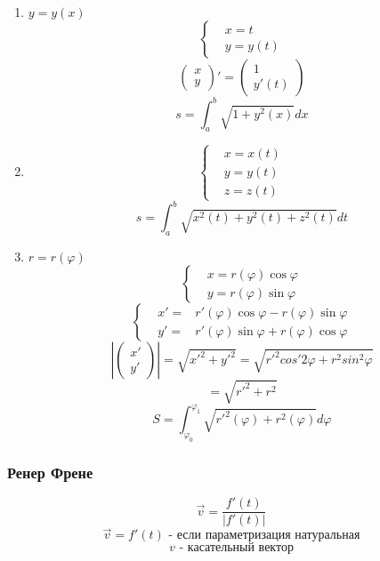 \documentclass[12pt, fleqn]{article}
\begin{document}
\begin{examples}
		\begin{enumerate}
			\item $y = y(x)$
				\[\left\{\begin{align}
						&x = t\\
						&y = y(t)
				\end{align}\]
				\[\begin{pmatrix}
					x\\
					y
				\end{pmatrix}' = \begin{pmatrix}
					1\\
					y'(t)
				\end{pmatrix}\]
				\[s = \int_a^b \sqrt{1 + y^2(x)} dx\]
			\item \[\displaystyle \left \{ \begin{align}
					& x = x(t)\\
					& y = y(t)\\
					& z = z(t)
					\end{align}\]
					\[s = \int_a^b \sqrt{x^2(t) + y^2(t) + z^2(t)}dt\]
			\item $r = r(\varphi)$
				\[\left\{ \begin{align}
						&x = r(\varphi) \cos \varphi\\
						&y = r(\varphi) \sin \varphi
				\end{align}\]
				\[\left\{ \begin{align}
						&x' = &r'(\varphi) \cos \varphi - r(\varphi)\sin \varphi\\
						&y' = &r'(\varphi) \sin \varphi + r(\varphi)\cos \varphi
				\end{align}\]
				\[|\begin{pmatrix}
					x'\\
					y'
				\end{pmatrix}| = 
				\sqrt{x'^2 + y'^2} = \sqrt{r'^2 cos'2 \varphi + r^2 sin^2 \varphi }\]
				\[= \sqrt{r'^2 + r^2}\]
				\[S = \int_{\varphi_0}^{\varphi_1} \sqrt{r'^2(\varphi) + r^2(\varphi)}d\varphi  \]
		\end{enumerate}
\end{examples}

\subsubsection{Ренер Френе}
\begin{Definition}
	\[\vec{v} = \frac{f'(t)}{|f'(t)|}\]
	\[\vec{v} = f'(t) \text{ - если параметризация натуральная}\]
	\[v \text{ - касательный вектор}\]
\end{Definition}
\end{document}
